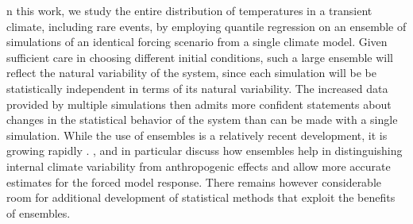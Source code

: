 \documentclass{ametsoc}
\begin{document}
n this work, we study the entire distribution of temperatures in a transient climate, including rare events, by employing quantile regression on an ensemble of simulations of an identical forcing scenario from a single climate model.
Given sufficient care in choosing different initial conditions, such a large ensemble will reflect the natural variability of the system, since each simulation will be be statistically independent in terms of its natural variability. 
The increased data provided by multiple simulations %
then admits more confident statements about changes in the statistical behavior of the system %
than can be made with a single simulation. While the use of ensembles is a relatively recent development, it is growing rapidly \citep[e.g.][]{deser2012uncertainty, deser2012communication,deser2014projecting,fischer2014detection, kay2015community,sriver2015effects, rodgers2015emergence, hagos2016projection}. \citet{deser2012uncertainty}, \citet{deser2012communication} and \citet{fischer2014detection} in particular discuss how ensembles help in distinguishing internal climate variability from anthropogenic effects and allow more accurate estimates for the forced model response. There remains however considerable room for additional development of statistical methods that exploit the benefits of ensembles. 
\end{document}

